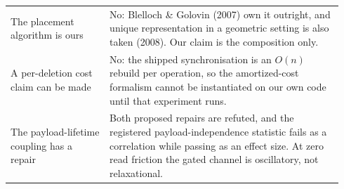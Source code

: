{\begin{center}
\begin{tabular}{p{0.28\linewidth}p{0.66\linewidth}}
The placement algorithm is ours & No: Blelloch \& Golovin (2007) own it outright, and unique representation in a geometric setting is also taken (2008). Our claim is the composition only.\\
A per-deletion cost claim can be made & No: the shipped synchronisation is an $O(n)$ rebuild per operation, so the amortized-cost formalism cannot be instantiated on our own code until that experiment runs.\\
The payload-lifetime coupling has a repair & Both proposed repairs are refuted, and the registered payload-independence statistic fails as a correlation while passing as an effect size. At zero read friction the gated channel is oscillatory, not relaxational.\\
\bottomrule
\end{tabular}


\end{center}}
